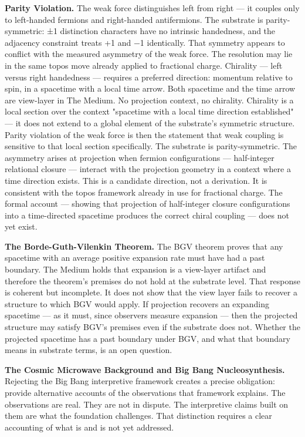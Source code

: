 \documentclass[11pt,letterpaper]{article}
\begin{document}
\textbf{Parity Violation.} The weak force distinguishes left from right --- it couples only to left-handed fermions and right-handed antifermions. The substrate is parity-symmetric: ±1 distinction characters have no intrinsic handedness, and the adjacency constraint treats +1 and −1 identically. That symmetry appears to conflict with the measured asymmetry of the weak force. The resolution may lie in the same topos move already applied to fractional charge. Chirality --- left versus right handedness --- requires a preferred direction: momentum relative to spin, in a spacetime with a local time arrow. Both spacetime and the time arrow are view-layer in The Medium. No projection context, no chirality. Chirality is a local section over the context "spacetime with a local time direction established" --- it does not extend to a global element of the substrate's symmetric structure. Parity violation of the weak force is then the statement that weak coupling is sensitive to that local section specifically. The substrate is parity-symmetric. The asymmetry arises at projection when fermion configurations --- half-integer relational closure --- interact with the projection geometry in a context where a time direction exists. This is a candidate direction, not a derivation. It is consistent with the topos framework already in use for fractional charge. The formal account --- showing that projection of half-integer closure configurations into a time-directed spacetime produces the correct chiral coupling --- does not yet exist.

\textbf{The Borde-Guth-Vilenkin Theorem.} The BGV theorem proves that any spacetime with an average positive expansion rate must have had a past boundary. The Medium holds that expansion is a view-layer artifact and therefore the theorem's premises do not hold at the substrate level. That response is coherent but incomplete. It does not show that the view layer fails to recover a structure to which BGV would apply. If projection recovers an expanding spacetime --- as it must, since observers measure expansion --- then the projected structure may satisfy BGV's premises even if the substrate does not. Whether the projected spacetime has a past boundary under BGV, and what that boundary means in substrate terms, is an open question.

\textbf{The Cosmic Microwave Background and Big Bang Nucleosynthesis.} Rejecting the Big Bang interpretive framework creates a precise obligation: provide alternative accounts of the observations that framework explains. The observations are real. They are not in dispute. The interpretive claims built on them are what the foundation challenges. That distinction requires a clear accounting of what is and is not yet addressed.
\end{document}
